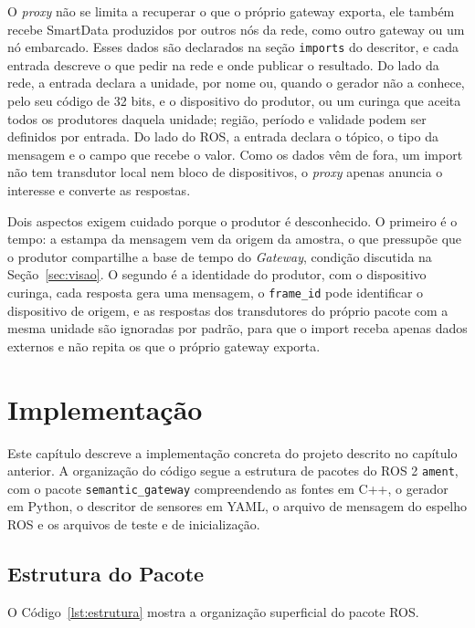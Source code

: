 \documentclass[
    12pt,
    oneside,
    a4paper,
    chapter=TITLE,
    section=TITLE,
    english,
    brazil
]{abntex2}
\begin{document}
O \textit{proxy} não se limita a recuperar o que o próprio gateway
exporta, ele também recebe SmartData produzidos por outros nós da rede,
como outro gateway ou um nó embarcado. Esses dados são declarados na seção
\texttt{imports} do descritor, e cada entrada descreve o que pedir na
rede e onde publicar o resultado. Do lado da rede, a entrada declara a
unidade, por nome ou, quando o gerador não a conhece, pelo seu código de
32 bits, e o dispositivo do produtor, ou um curinga que aceita todos os
produtores daquela unidade; região, período e validade podem ser
definidos por entrada. Do lado do ROS, a entrada declara o tópico, o tipo
da mensagem e o campo que recebe o valor. Como os dados vêm de fora, um
import não tem transdutor local nem bloco de dispositivos, o
\textit{proxy} apenas anuncia o interesse e converte as respostas.

Dois aspectos exigem cuidado porque o produtor é desconhecido. O
primeiro é o tempo: a estampa da mensagem vem da origem da amostra, o
que pressupõe que o produtor compartilhe a base de tempo do
\textit{Gateway}, condição discutida na Seção~\ref{sec:visao}. O segundo
é a identidade do produtor, com o dispositivo curinga, cada resposta
gera uma mensagem, o \texttt{frame\_id} pode identificar o dispositivo
de origem, e as respostas dos transdutores do próprio pacote com a mesma
unidade são ignoradas por padrão, para que o import receba apenas dados
externos e não repita os que o próprio gateway exporta.

\chapter{Implementação}
\label{cap:implementacao}

Este capítulo descreve a implementação concreta do projeto descrito no
capítulo anterior. A organização do código segue a estrutura de pacotes
do ROS 2 \texttt{ament}, com o pacote \texttt{semantic\_gateway}
compreendendo as fontes em C++, o gerador em Python, o descritor de
sensores em YAML, o arquivo de mensagem do espelho ROS e os arquivos
de teste e de inicialização.

\section{Estrutura do Pacote}
\label{sec:estrutura}

O Código~\ref{lst:estrutura} mostra a organização superficial do pacote
ROS.
\end{document}
